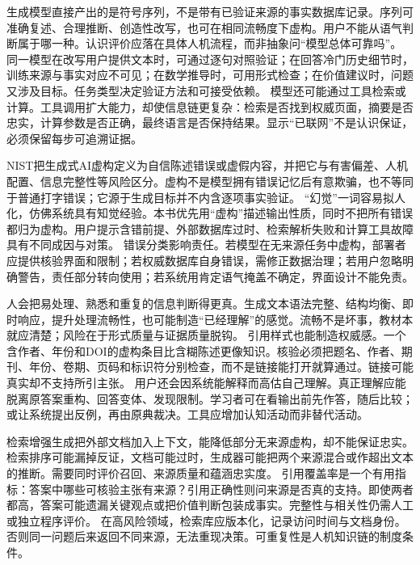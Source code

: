 生成模型直接产出的是符号序列，不是带有已验证来源的事实数据库记录。序列可准确复述、合理推断、创造性改写，也可在相同流畅度下虚构。用户不能从语气判断属于哪一种。认识评价应落在具体人机流程，而非抽象问“模型总体可靠吗”。 同一模型在改写用户提供文本时，可通过逐句对照验证；在回答冷门历史细节时，训练来源与事实对应不可见；在数学推导时，可用形式检查；在价值建议时，问题又涉及目标。任务类型决定验证方法和可接受依赖。 模型还可能通过工具检索或计算。工具调用扩大能力，却使信息链更复杂：检索是否找到权威页面，摘要是否忠实，计算参数是否正确，最终语言是否保持结果。显示“已联网”不是认识保证，必须保留每步可追溯证据。

NIST把生成式AI虚构定义为自信陈述错误或虚假内容，并把它与有害偏差、人机配置、信息完整性等风险区分\parencite{nist2024}。虚构不是模型拥有错误记忆后有意欺骗，也不等同于普通打字错误；它源于生成目标并不内含逐项事实验证。 “幻觉”一词容易拟人化，仿佛系统具有知觉经验。本书优先用“虚构”描述输出性质，同时不把所有错误都归为虚构。用户提示含错前提、外部数据库过时、检索解析失败和计算工具故障具有不同成因与对策。 错误分类影响责任。若模型在无来源任务中虚构，部署者应提供核验界面和限制；若权威数据库自身错误，需修正数据治理；若用户忽略明确警告，责任部分转向使用；若系统用肯定语气掩盖不确定，界面设计不能免责。

人会把易处理、熟悉和重复的信息判断得更真。生成文本语法完整、结构均衡、即时响应，提升处理流畅性，也可能制造“已经理解”的感觉。流畅不是坏事，教材本就应清楚；风险在于形式质量与证据质量脱钩。 引用样式也能制造权威感。一个含作者、年份和DOI的虚构条目比含糊陈述更像知识。核验必须把题名、作者、期刊、年份、卷期、页码和标识符分别检查，而不是链接能打开就算通过。链接可能真实却不支持所引主张。 用户还会因系统能解释而高估自己理解。真正理解应能脱离原答案重构、回答变体、发现限制。学习者可在看输出前先作答，随后比较；或让系统提出反例，再由原典裁决。工具应增加认知活动而非替代活动。

检索增强生成把外部文档加入上下文，能降低部分无来源虚构，却不能保证忠实。检索排序可能漏掉反证，文档可能过时，生成器可能把两个来源混合或作超出文本的推断。需要同时评价召回、来源质量和蕴涵忠实度。 引用覆盖率是一个有用指标：答案中哪些可核验主张有来源？引用正确性则问来源是否真的支持。即使两者都高，答案可能遗漏关键观点或把价值判断包装成事实。完整性与相关性仍需人工或独立程序评价。 在高风险领域，检索库应版本化，记录访问时间与文档身份。否则同一问题后来返回不同来源，无法重现决策。可重复性是人机知识链的制度条件。


